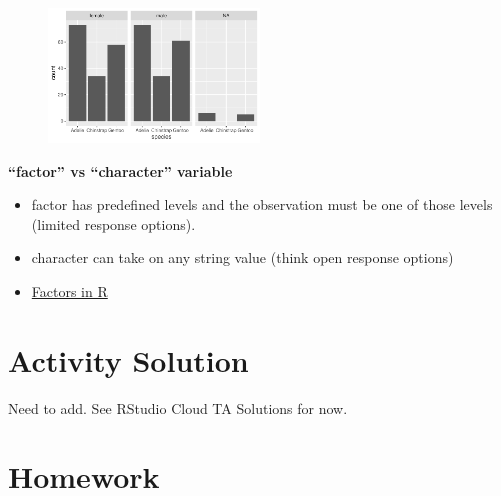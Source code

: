 \documentclass[
  letterpaper,
  DIV=11,
  numbers=noendperiod]{scrreprt}
\providecommand{\tightlist}{%
  \setlength{\itemsep}{0pt}\setlength{\parskip}{0pt}}\usepackage{longtable,booktabs,array}
\begin{document}
\begin{tcolorbox}[enhanced jigsaw, colframe=quarto-callout-note-color-frame, breakable, colback=white, toprule=.15mm, leftrule=.75mm, left=2mm, opacityback=0, rightrule=.15mm, arc=.35mm, bottomrule=.15mm]
\begin{figure}[H]

{\centering \includegraphics[width=0.5\textwidth,height=\textheight]{05-content_files/figure-pdf/faceted-barplot-1.pdf}

}

\end{figure}

\end{tcolorbox}

\begin{tcolorbox}[enhanced jigsaw, colframe=quarto-callout-note-color-frame, breakable, colback=white, toprule=.15mm, leftrule=.75mm, left=2mm, opacityback=0, rightrule=.15mm, arc=.35mm, bottomrule=.15mm]

\textbf{``factor'' vs ``character'' variable}

\begin{itemize}
\tightlist
\item
  factor has predefined levels and the observation must be one of those
  levels (limited response options).
\item
  character can take on any string value (think open response options)
\item
  \href{https://www.stat.berkeley.edu/~s133/factors.html}{Factors in R}
\end{itemize}

\end{tcolorbox}

\hypertarget{activity-solution-3}{%
\section*{Activity Solution}\label{activity-solution-3}}

Need to add. See RStudio Cloud TA Solutions for now.

\hypertarget{homework-4}{%
\section*{Homework}\label{homework-4}}
\end{document}
